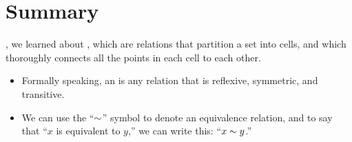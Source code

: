 \documentclass[../../../main.tex]{subfiles}
\begin{document}
\section{Summary}

, we learned about , which are relations that partition a set into cells, and which thoroughly connects all the points in each cell to each other.

\begin{itemize}
  \item Formally speaking, an  is any relation that is reflexive, symmetric, and transitive.
  \item We can use the ``$\equivalence/$'' symbol to denote an equivalence relation, and to say that ``$x$ is equivalent to $y$,'' we can write this: ``$x \equivalence/ y$.''
\end{itemize} 
\end{document}
